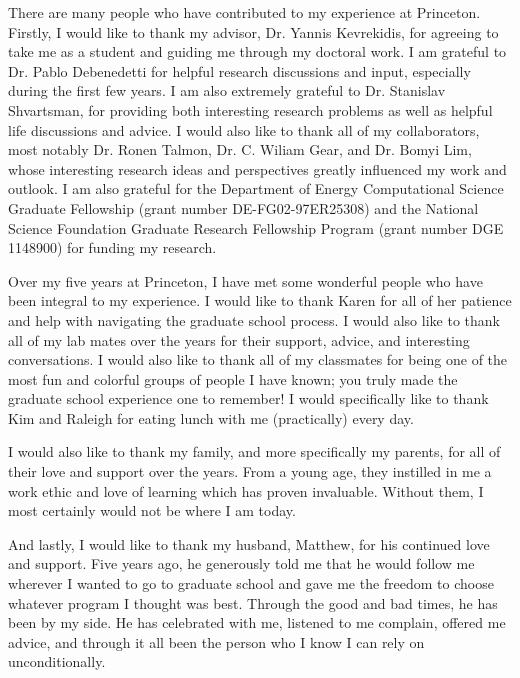 
There are many people who have contributed to my experience at Princeton. 
%
Firstly, I would like to thank my advisor, Dr. Yannis Kevrekidis, for agreeing to take me as a student and guiding me through my doctoral work. 
%
I am grateful to Dr. Pablo Debenedetti for helpful research discussions and input, especially during the first few years. 
%
I am also extremely grateful to Dr. Stanislav Shvartsman, for providing both interesting research problems as well as helpful life discussions and advice. 
%
I would also like to thank all of my collaborators, most notably Dr. Ronen Talmon, Dr. C. Wiliam Gear, and Dr. Bomyi Lim, whose interesting research ideas and perspectives greatly influenced my work and outlook.
%
I am also grateful for the Department of Energy Computational Science Graduate Fellowship (grant number DE-FG02-97ER25308) and the National Science Foundation Graduate Research Fellowship Program (grant number DGE 1148900) for funding my research. 

Over my five years at Princeton, I have met some wonderful people who have been integral to my experience.
%
I would like to thank Karen for all of her patience and help with navigating the graduate school process. 
%
I would also like to thank all of my lab mates over the years for their support, advice, and interesting conversations.
%
I would also like to thank all of my classmates for being one of the most fun and colorful groups of people I have known; you truly made the graduate school experience one to remember!
%
I would specifically like to thank Kim and Raleigh for eating lunch with me (practically) every day.

I would also like to thank my family, and more specifically my parents, for all of their love and support over the years. 
%
From a young age, they instilled in me a work ethic and love of learning which has proven invaluable. 
%
Without them, I most certainly would not be where I am today. 

And lastly, I would like to thank my husband, Matthew, for his continued love and support. 
%
Five years ago, he generously told me that he would follow me wherever I wanted to go to graduate school and gave me the freedom to choose whatever program I thought was best. 
%
Through the good and bad times, he has been by my side. 
%
He has celebrated with me, listened to me complain, offered me advice, and through it all been the person who I know I can rely on unconditionally. 
